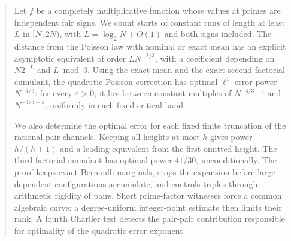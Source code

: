 \begin{abstract}
Let \(f\) be a completely multiplicative function whose values
at primes are independent fair signs. We count starts of
constant runs of length at least \(L\) in \([N,2N)\), with
\(L=\log_2N+O(1)\) and both signs included.
The distance from the Poisson law with nominal or exact mean
has an explicit asymptotic equivalent of order \(LN^{-2/3}\),
with a coefficient depending on \(N2^{-L}\) and \(L\bmod3\).
Using the exact mean and the exact second factorial cumulant,
the quadratic Poisson correction has optimal \(\ell^1\) error
power \(N^{-4/3}\): for every
\(\varepsilon>0\), it lies between constant multiples of
\(N^{-4/3-\varepsilon}\) and \(N^{-4/3+\varepsilon}\),
uniformly in each fixed critical band.

We also determine the optimal error for each fixed finite
truncation of the rational pair channels. Keeping all heights
at most \(h\) gives power \(h/(h+1)\) and a leading equivalent
from the first omitted height. The third factorial cumulant
has optimal power \(41/30\), unconditionally.
The proof keeps exact Bernoulli marginals, stops the expansion
before large dependent configurations accumulate, and controls
triples through arithmetic rigidity of pairs.
Short prime-factor witnesses force a common algebraic curve;
a degree-uniform integer-point estimate then limits their
rank. A fourth Charlier test detects the pair-pair contribution
responsible for optimality of the quadratic error exponent.
\end{abstract}

